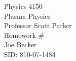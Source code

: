 \begin{titlepage}
\setlength{\topmargin}{1.5in}
\begin{center}
\Huge{Physics 4150} \\
\LARGE{Plasma Physics} \\
\Large{Professor Scott Parker} \\[1cm]


\huge{Homework \#\HWnum}\\[0.5cm]

\large{Joe Becker} \\
\large{SID: 810-07-1484} \\
\large{\due} 

\end{center}

\end{titlepage}

